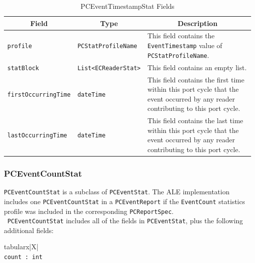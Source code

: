 \documentclass[11pt,a4paper,oneside]{article}
\newenvironment{bbox}%
{\begin{table}[h!]\begin{threeparttable}}%
{\end{threeparttable}\end{table}\FloatBarrier}
\newenvironment{bbox}
{\ifvmode\IgnorePar\fi \EndP\Tg<div class='bbox'>}{\Tg</div>\IgnoreIndent}
\begin{document}
\begin{table}[!h]
\begin{tabular}{
  |p{}%
  |p{}%
  |p{}|%
  }
\hline
\multicolumn{1}{|c|}{\textbf{Field}}&
\multicolumn{1}{c|}{\textbf{Type}}&
\multicolumn{1}{c|}{\textbf{Description}}\\
\hline 
\texttt{profile} &\texttt{PCStatProfileName}&This field contains the \texttt{EventTimestamp} value of \texttt{PCStatProfileName}.\\ 
\hline 
\texttt{statBlock} &\texttt{List<ECReaderStat>}&This field contains an empty list.\\
\hline
\texttt{firstOccurring}\newline\texttt{Time}&\texttt{dateTime}&This field contains the first time within this port cycle that the event occurred by any reader contributing to this port cycle.\\ 
\hline
\texttt{lastOccurring}\newline\texttt{Time}&\texttt{dateTime}&This field contains the last time within this port cycle that the event occurred by any reader contributing to this port cycle.\\ \hline
\end{tabular}
\caption{PCEventTimestampStat  Fields}
\MakeLineNo
\end{table}
\FloatBarrier

\subsubsection{PCEventCountStat}
\texttt{PCEventCountStat} is a subclass of \texttt{PCEventStat}. The ALE implementation includes one \texttt{PCEventCountStat} in a \texttt{PCEventReport} if the \texttt{EventCount} statistics profile was included in the corresponding \texttt{PCReportSpec}.\\
\texttt{ PCEventCountStat} includes all of the fields in \texttt{PCEventStat}, plus the following additional fields:

\begin{bbox}
\begin{edtable}{tabularx}{\linewidth}{|X|}
\hline 
{}
\\
\texttt{count : int}\\
\texttt{\textendash \textendash \textendash}\\
\hline
\end{edtable}
\end{bbox}
\end{document}
